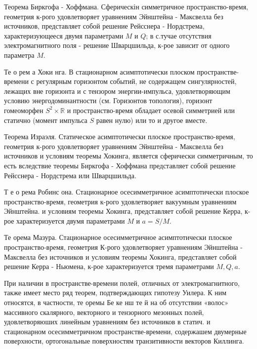 \documentclass[10pt]{article}
\begin{document}
Теорема Биркгофа - Хоффмана. Сферическін симметричное пространство-время, геометрия к-рого удовлетворяет уравнениям Эйнштейна - Максвелла без источников, представляет собой решение Рейсснера - Нордстрема, характеризующееся двумя параметрами $M$ и $Q$; в с.тучае отсутствия электромагнитного поля - решение Шварцшильда, к-рое зависит от одного параметра $M$.



Те о рем а Хоки нга. В стационарном асимптотически плоском пространстве-времени с регулярным горизонтом событий, не содержащем сингулярностей, лежащих вне горизонта и с тензором энергии-импульса, удовлетворяющим условию энергодоминантности (см. Горизонтов топология), горизонт гомеоморфен $S^{2} \times \mathbb{R}$ и пространство-время обладает осевой симметрией или статично (момент импульса $S$ равен нулю) или то и другое вместе.



Теорема Израэля. Статическое асимптотически плоское пространство-время, геометрия к-рого удовлетворяет уравнениям Эйнштейна - Максвелла без источников и условиям теоремы Хокинга, является сферически симметричным, то есть вследствие теоремы Биркгофа - Хоффмана представляет собой решение Рейсснера - Нордстрема или Шварцшильда.



Т е о рема Робинс она. Стационарное осесимметричное асимптотически плоское пространство-время, геометрия к-рого удовлетворяет вакуумным уравнениям Эйнштейна. и условиям теоремы Хокинга, представляет собой решение Керра, к-рое характеризуется двумя параметрами $M$ и $a=S / M$.



Те орема Мазура. Стационарное осесимметричное асимптотически плоское пространство-время, геометрия К-рого удовлетворяет уравнениям Эйнштейна - Максвелла без источников и условиям теоремы Хокинга, представляет собой решение Керра - Ньюмена, к-рое характеризуется тремя параметрами $M, Q, a$.



При наличии в пространстве-времени полей, отличных от электромагнитного, также имеет место ряд теорем, подтверждающих гипотезу Уилера. К ним относятся, в частности, те оремы Бе ке нш те й на об отсутствии «волос» массивного скалярного, векторного и тензорного мезонных полей, удовлетворяюших линейным уравнениям без источников в статич. и стационарном осесимметричном пространстве-времени, содержашем двумерные поверхности, ортогональные поверхностям транзитивности векторов Киллинга.
\end{document}

